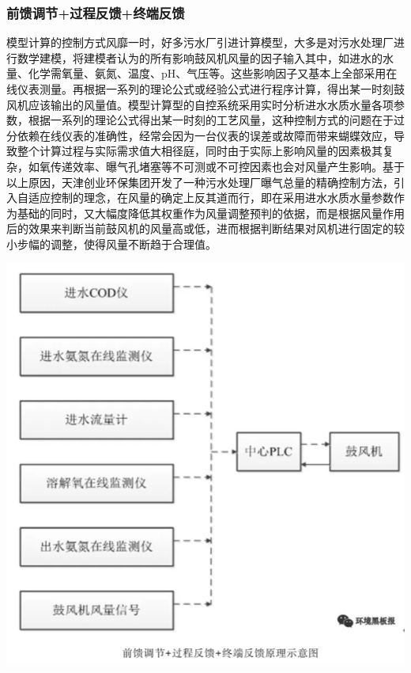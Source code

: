 \documentclass[
]{book}
\begin{document}
\hypertarget{ux524dux9988ux8c03ux8282ux8fc7ux7a0bux53cdux9988ux7ec8ux7aefux53cdux9988}{%
\subsubsection{前馈调节+过程反馈+终端反馈}\label{ux524dux9988ux8c03ux8282ux8fc7ux7a0bux53cdux9988ux7ec8ux7aefux53cdux9988}}

模型计算的控制方式风靡一时，好多污水厂引进计算模型，大多是对污水处理厂进行数学建模，将建模者认为的所有影响鼓风机风量的因子输入其中，如进水的水量、化学需氧量、氨氮、温度、pH、气压等。这些影响因子又基本上全部采用在线仪表测量。再根据一系列的理论公式或经验公式进行程序计算，得出某一时刻鼓风机应该输出的风量值。模型计算型的自控系统采用实时分析进水水质水量各项参数，根据一系列的理论公式得出某一时刻的工艺风量，这种控制方式的问题在于过分依赖在线仪表的准确性，经常会因为一台仪表的误差或故障而带来蝴蝶效应，导致整个计算过程与实际需求值大相径庭，同时由于实际上影响风量的因素极其复杂，如氧传递效率、曝气孔堵塞等不可测或不可控因素也会对风量产生影响。基于以上原因，天津创业环保集团开发了一种污水处理厂曝气总量的精确控制方法，引入自适应控制的理念，在风量的确定上反其道而行，即在采用进水水质水量参数作为基础的同时，又大幅度降低其权重作为风量调整预判的依据，而是根据风量作用后的效果来判断当前鼓风机的风量高或低，进而根据判断结果对风机进行固定的较小步幅的调整，使得风量不断趋于合理值。

\includegraphics[width=8.24in]{images/bq6}
\end{document}
